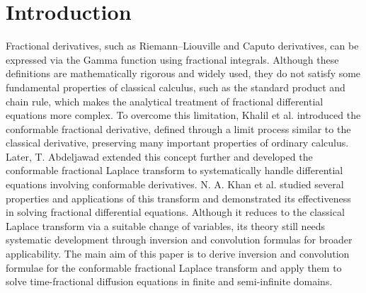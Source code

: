 \documentclass[two side,reqno,12pt]{amsart}
\numberwithin{equation}{section}
\theoremstyle{definition}
\begin{document}
	\section{Introduction}
Fractional derivatives, such as Riemann–Liouville and Caputo derivatives, can be expressed via the Gamma function using fractional integrals. Although these definitions are mathematically rigorous and widely used, they do not satisfy some fundamental properties of classical calculus, such as the standard product and chain rule, which makes the analytical treatment of fractional differential equations more complex. To overcome this limitation, Khalil et al. \cite{khalil2014} introduced the conformable fractional derivative, defined through a limit process similar to the classical derivative, preserving many important properties of ordinary calculus. Later, T. Abdeljawad \cite{abdeljawad2015} extended this concept further and developed the conformable fractional Laplace transform to systematically handle differential equations involving conformable derivatives. N. A. Khan et al. \cite{khan2018some} studied several properties and applications of this transform and demonstrated its effectiveness in solving fractional differential equations. Although it reduces to the classical Laplace transform via a suitable change of variables, its theory still needs systematic development through inversion and convolution formulas for broader applicability. The main aim of this paper is to derive inversion and convolution formulae for the conformable fractional Laplace transform and apply them to solve time-fractional diffusion equations in finite and semi-infinite domains.
\end{document}
